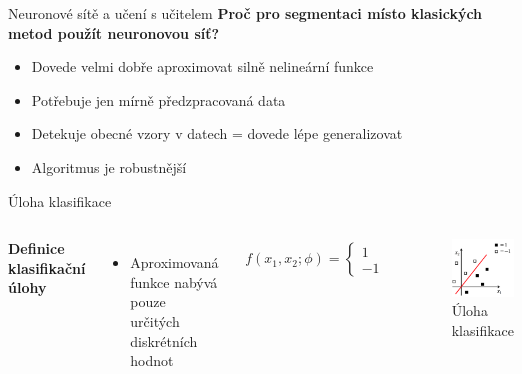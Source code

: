 \documentclass[aspectratio=1610]{beamer}
\begin{document}
\begin{frame}{Neuronové sítě a učení s učitelem}
\textbf{Proč pro segmentaci místo klasických metod použít neuronovou síť?}
\begin{itemize}
	\item Dovede velmi dobře aproximovat silně nelineární funkce
	\item Potřebuje jen mírně předzpracovaná data
	\item Detekuje obecné vzory v datech = dovede lépe generalizovat
	\item Algoritmus je robustnější
	
\end{itemize}
\end{frame}
\begin{frame}{Úloha klasifikace}
\begin{columns}
	\textbf{Definice klasifikační úlohy}
	\vspace{3mm}
	\begin{itemize}
		\item Aproximovaná funkce nabývá pouze určitých diskrétních hodnot
	\end{itemize}
	\begin{gather}
	f(x_1,x_2;\phi) = 
	\begin{cases}	
	1\\
	-1  
	\end{cases} 
	\end{gather}	
	\begin{figure}[h]
		\begin{center}
			\includegraphics[width=5cm, keepaspectratio]{linsep.png}
		\end{center}
		\caption{Úloha klasifikace} 	
	\end{figure}
\end{columns}	

\end{frame}
\end{document}
